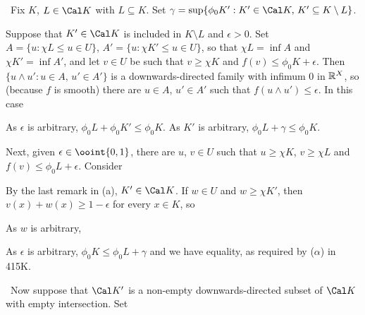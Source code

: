 {\medskip 
      
\quad\grheada\ Fix $K$, $L\in\Cal K$ with $L\subseteq K$.   Set 
$\gamma=\sup\{\phi_0K':K'\in\Cal K,\,K'\subseteq K\setminus L\}$. 
      
\medskip 
      
 Suppose that $K'\in\Cal K$ is included in $K\setminus L$ 
and $\epsilon>0$.   Set $A=\{u:\chi L\le u\in U\}$, $A'=\{u:\chi K'\le 
u\in 
U\}$, so that $\chi L=\inf A$ and $\chi K'=\inf A'$, and let $v\in U$ be 
such that $v\ge\chi K$ and $f(v)\le\phi_0K+\epsilon$.   Then $\{u\wedge 
u':u\in A,\,u'\in A'\}$ is a downwards-directed family with infimum $0$ 
in 
$\Bbb R^X$, so (because $f$ is smooth) there are $u\in A$, $u'\in A'$ 
such 
that $f(u\wedge u')\le\epsilon$.   In this case 
      
      
\noindent As $\epsilon$ is arbitrary, $\phi_0L+\phi_0K'\le \phi_0K$. 
As 
$K'$ is arbitrary, $\phi_0L+\gamma\le\phi_0K$. 
      
\medskip 
      
 Next, given $\epsilon\in\ooint{0,1}$, there are $u$, 
$v\in 
U$ such that $u\ge\chi K$, $v\ge\chi L$ and $f(v)\le\phi_0L+\epsilon$. 
Consider 
      
      
\noindent By the last remark in (a), $K'\in\Cal K$.   If $w\in U$ and 
$w\ge\chi K'$, then $v(x)+w(x)\ge 1-\epsilon$ for every $x\in K$, so 
      
      
\noindent As $w$ is arbitrary, 
      
      
\noindent As $\epsilon$ is arbitrary, $\phi_0K\le\phi_0L+\gamma$ and we 
have equality, as required by ($\alpha$) in 415K. 
      
\medskip 
      
\quad\grheadb\ Now suppose that $\Cal K'$ is a non-empty 
downwards-directed subset of $\Cal K$ with empty intersection.   Set 
      
      
}
